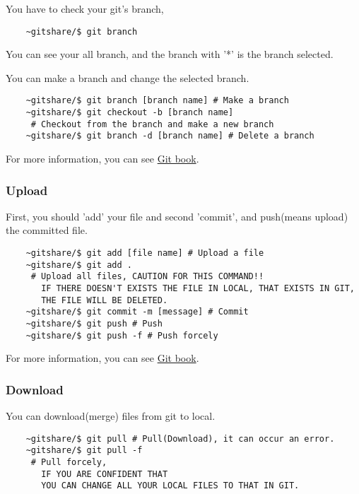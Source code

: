 You have to check your git's branch,

\begin{verbatim}
    ~gitshare/$ git branch
\end{verbatim}

You can see your all branch, and the branch with '*' is the branch selected.

You can make a branch and change the selected branch.

\begin{verbatim}
    ~gitshare/$ git branch [branch name] # Make a branch
    ~gitshare/$ git checkout -b [branch name]
     # Checkout from the branch and make a new branch
    ~gitshare/$ git branch -d [branch name] # Delete a branch
\end{verbatim}

For more information, you can see \href{https://git-scm.com/book/en/v2}{Git book}.

\subsubsection{Upload}

First, you should 'add' your file and second 'commit', and push(means upload) the committed file.

\begin{verbatim}
    ~gitshare/$ git add [file name] # Upload a file
    ~gitshare/$ git add .
     # Upload all files, CAUTION FOR THIS COMMAND!!
       IF THERE DOESN'T EXISTS THE FILE IN LOCAL, THAT EXISTS IN GIT,
       THE FILE WILL BE DELETED.
    ~gitshare/$ git commit -m [message] # Commit
    ~gitshare/$ git push # Push
    ~gitshare/$ git push -f # Push forcely
\end{verbatim}

For more information, you can see \href{https://git-scm.com/book/en/v2}{Git book}.

\subsubsection{Download}

You can download(merge) files from git to local.

\begin{verbatim}
    ~gitshare/$ git pull # Pull(Download), it can occur an error.
    ~gitshare/$ git pull -f
     # Pull forcely,
       IF YOU ARE CONFIDENT THAT
       YOU CAN CHANGE ALL YOUR LOCAL FILES TO THAT IN GIT.
\end{verbatim}

